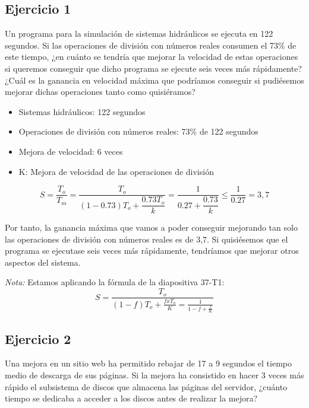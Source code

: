 \subsection*{Ejercicio 1}

Un programa para la simulación de sistemas hidráulicos se ejecuta en 122 segundos. Si las operaciones de división con números reales consumen el 73\% de este tiempo, ¿en cuánto se tendría que mejorar la velocidad de estas operaciones si queremos conseguir que dicho programa se ejecute seis veces más rápidamente? ¿Cuál es la ganancia en velocidad máxima que podríamos conseguir si pudiésemos mejorar dichas operaciones tanto como quisiéramos?\\

\begin{itemize}
    \item Sistemas hidráulicos: 122 segundos
    \item Operaciones de división con números reales: 73\% de 122 segundos
    \item Mejora de velocidad: 6 veces
    \item K: Mejora de velocidad de las operaciones de división
\end{itemize}

\begin{equation*}
    S = \frac{T_o}{T_m} = \dfrac{T_o}{(1-0.73)T_o + \dfrac{0.73T_o}{k}}
    = \dfrac{1}{0.27 + \dfrac{0.73}{k}}\leq \dfrac{1}{0.27} = 3,7
\end{equation*}

Por tanto, la ganancia máxima que vamos a poder conseguir mejorando tan solo las operaciones de división con números reales es de 3,7. Si quisiésemos que el programa se ejecutase seis veces más rápidamente, tendríamos que mejorar otros aspectos del sistema.

\textit{Nota:} Estamos aplicando la fórmula de la diapositiva 37-T1:
\begin{equation}
    S = \frac{T_o}{(1-f)T_o + \frac{f x T_o}{K} = \frac{1}{1-f + \frac{f}{K}}}
\end{equation}

\subsection*{Ejercicio 2}

Una mejora en un sitio web ha permitido rebajar de 17 a 9 segundos el tiempo medio de descarga de sus páginas. Si la mejora ha consistido en hacer 3 veces más rápido el subsistema de discos que almacena las páginas del servidor, ¿cuánto tiempo se dedicaba a acceder a los discos antes de realizar la mejora?\\

